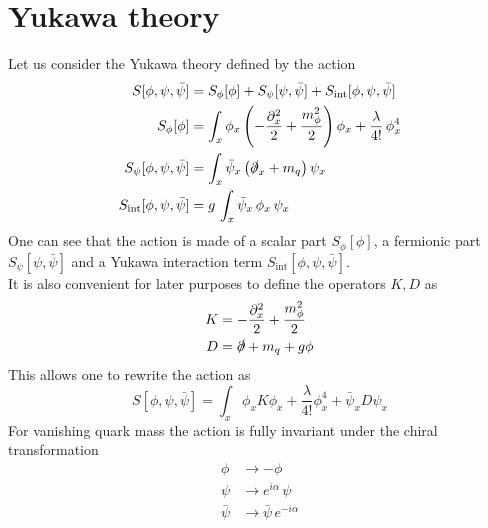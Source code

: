\section{Yukawa theory}
\label{sec:Yukawa_theory}
Let us consider the Yukawa theory defined by the action
\begin{equation}
\begin{aligned}
    S[\phi,\psi,\bar\psi] &= S_\phi[\phi] + S_\psi[\psi, \bar\psi] + S_\text{int}[\phi, \psi, \bar\psi]\\
     S_\phi[\phi] &= \int_x \phi_x \left(-\frac{\partial^2_x}{2} + \frac{m_\phi^2}{2}\right) \phi_x + \frac{\lambda}{4!} \, \phi_x^4 \\
     S_\psi[\phi, \psi, \bar\psi] &= \int_x \bar \psi_x \left(\slashed{\partial}_x + m_q \right) \psi_x \\
     S_\text{int}[\phi, \psi, \bar\psi] &= g \, \int_x \bar \psi_x \, \phi_x \, \psi_x
    \label{eq:yukawa_continuum}
\end{aligned}
\end{equation}
One can see that the action is made of a scalar part $S_\phi[\phi]$, a fermionic part $S_\psi[\psi, \bar\psi]$ and a Yukawa interaction term $S_\text{int}[\phi, \psi, \bar\psi]$. \\
It is also convenient for later purposes to define the operators $K, D$ as 
\begin{equation}
    \begin{aligned}
        K &=  -\frac{\partial^2_x}{2} + \frac{m_\phi^2}{2} \\
        D &= \slashed{\partial} + m_q + g\phi 
    \end{aligned}
    \label{eq:definition_kinetic_terms_continuum}
\end{equation}
This allows one to rewrite the action as
\begin{equation*}
    S[\phi,\psi,\bar\psi] = \int_x \phi_x K \phi_x + \frac{\lambda}{4!}\phi_x^4 + \bar\psi_x D \psi_x
\end{equation*}
For vanishing quark mass the action is fully invariant under the chiral transformation
\begin{equation}
    \begin{aligned}
        \phi &\to -\phi \\
        \psi &\to e^{i\alpha} \, \psi \\
        \bar\psi &\to \bar\psi \, e^{-i\alpha} \\
    \end{aligned}
    \label{eq:yukawa_continuum_rewritten}
\end{equation}
